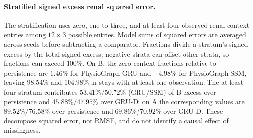 \paragraph{Stratified signed excess renal squared error.}\label{app:renalstrata}
The stratification uses zero, one to three, and at least four observed renal context entries among $12\times3$ possible entries. Model sums of squared errors are averaged across seeds before subtracting a comparator. Fractions divide a stratum's signed excess by the total signed excess; negative strata can offset other strata, so fractions can exceed $100\%$. On B, the zero-context fractions relative to persistence are $1.46\%$ for PhysioGraph-GRU and $-4.98\%$ for PhysioGraph-SSM, leaving $98.54\%$ and $104.98\%$ in stays with at least one observation. The at-least-four stratum contributes $53.41\%/50.72\%$ (GRU/SSM) of B excess over persistence and $45.88\%/47.95\%$ over GRU-D; on A the corresponding values are $89.52\%/76.58\%$ over persistence and $69.86\%/70.92\%$ over GRU-D. These decompose squared error, not RMSE, and do not identify a causal effect of missingness.


